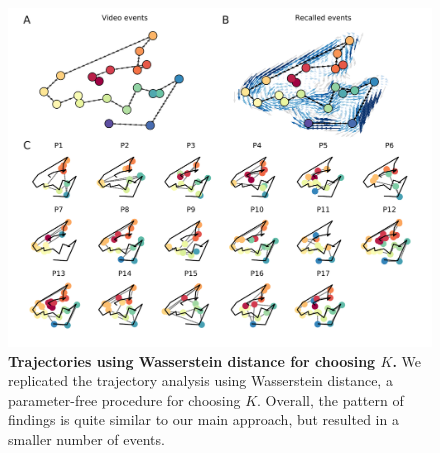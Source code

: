 \documentclass{article}
\begin{document}
\begin{figure}[p!]
\centering
\includegraphics[width=\textwidth]{figs/trajectory_wasserstein}
\caption{\small \textbf{Trajectories using Wasserstein distance for choosing $K$.}  We replicated the trajectory analysis using Wasserstein distance, a parameter-free procedure for choosing $K$. Overall, the pattern of findings is quite similar to our main approach, but resulted in a smaller number of events.}
\label{fig:trajectory_wasserstein}
\end{figure}
  
\

\newpage
\renewcommand{\refname}{Supplemental references}

\end{document}
